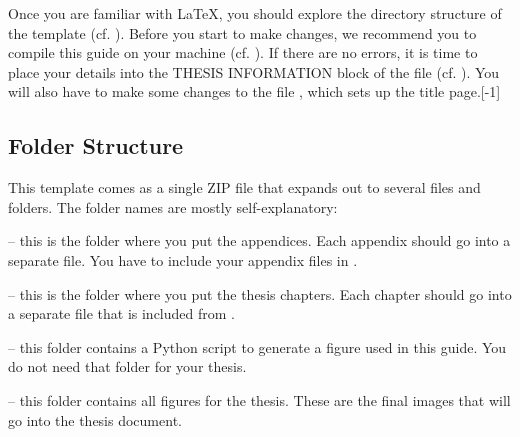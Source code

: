 Once you are familiar with LaTeX, you should explore the directory structure of the template (cf. ). Before you start to make changes, we recommend you to compile this guide on your machine (cf. ).
If there are no errors, it is time to place your details into the THESIS INFORMATION block of the  file (cf. ).
You will also have to make some changes to the file , which sets up the title page.[-1\baselineskip]


\subsection{Folder Structure}
\label{sec:folders}

This template comes as a single ZIP file that expands out to several files and folders. The folder names are mostly self-explanatory:

 -- this is the folder where you put the appendices. Each appendix should go into a separate  file. You have to include your appendix files in .

 -- this is the folder where you put the thesis chapters. Each chapter should go into a separate  file that is included from .

 -- this folder contains a Python script to generate a figure used in this guide. You do not need that folder for your thesis.

 -- this folder contains all figures for the thesis. These are the final images that will go into the thesis document.


